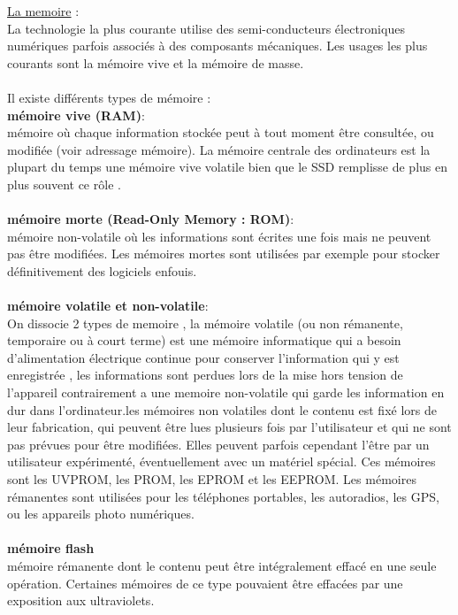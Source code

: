 \documentclass[a4paper,12pt,openany]{book}
\begin{document}
\underline{La memoire} :\\ 
La technologie la plus courante utilise des semi-conducteurs électroniques numériques parfois associés à des composants mécaniques. Les usages les plus courants sont la mémoire vive et la mémoire de masse.\\
\\
Il existe différents types de mémoire :\\
\textbf{mémoire vive (RAM)}:\\
mémoire où chaque information stockée peut à tout moment être consultée, ou modifiée (voir adressage mémoire). La mémoire centrale des ordinateurs est la plupart du temps une mémoire vive volatile bien que le SSD remplisse de plus en plus souvent ce rôle .\\
\\
\textbf{mémoire morte (Read-Only Memory : ROM)}:\\
mémoire non-volatile où les informations sont écrites une fois mais ne peuvent pas être modifiées. Les mémoires mortes sont utilisées par exemple pour stocker définitivement des logiciels enfouis.\\
\\
\textbf{mémoire volatile et non-volatile}:\\
On dissocie 2 types de memoire , la mémoire volatile (ou non rémanente, temporaire ou à court terme) est une mémoire informatique qui a besoin d'alimentation électrique continue pour conserver l'information qui y est enregistrée , les informations sont perdues lors de la mise hors tension de l'appareil contrairement a une memoire non-volatile qui garde les information en dur dans l'ordinateur.les mémoires non volatiles dont le contenu est fixé lors de leur fabrication, qui peuvent être lues plusieurs fois par l'utilisateur et qui ne sont pas prévues pour être modifiées. Elles peuvent parfois cependant l'être par un utilisateur expérimenté, éventuellement avec un matériel spécial. Ces mémoires sont les UVPROM, les PROM, les EPROM et les EEPROM. Les mémoires rémanentes sont utilisées pour les téléphones portables, les autoradios, les GPS, ou les appareils photo numériques.\\
\\
\textbf{mémoire flash}\\
mémoire rémanente dont le contenu peut être intégralement effacé en une seule opération. Certaines mémoires de ce type pouvaient être effacées par une exposition aux ultraviolets.\\
\\
\end{document}
